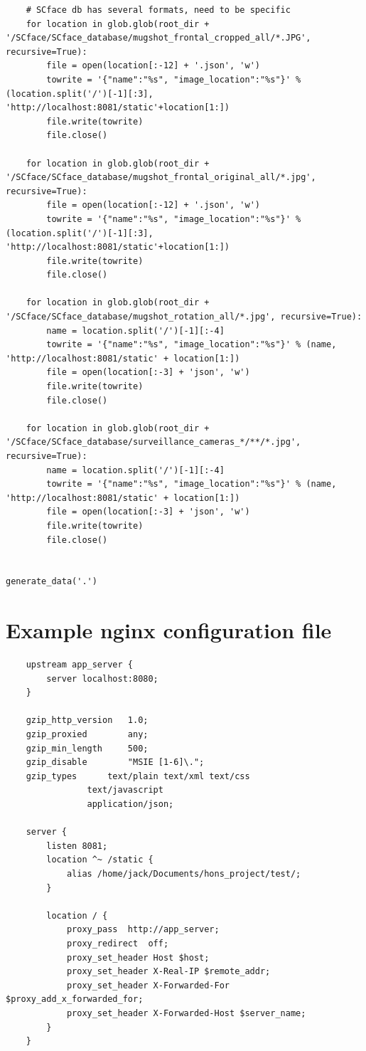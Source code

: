\documentclass[12pt]{article}
\begin{document}
\begin{appendices}
\begin{lstlisting}
    # SCface db has several formats, need to be specific
    for location in glob.glob(root_dir + '/SCface/SCface_database/mugshot_frontal_cropped_all/*.JPG', recursive=True):
        file = open(location[:-12] + '.json', 'w')
        towrite = '{"name":"%s", "image_location":"%s"}' % (location.split('/')[-1][:3], 'http://localhost:8081/static'+location[1:])
        file.write(towrite)
        file.close()

    for location in glob.glob(root_dir + '/SCface/SCface_database/mugshot_frontal_original_all/*.jpg', recursive=True):
        file = open(location[:-12] + '.json', 'w')
        towrite = '{"name":"%s", "image_location":"%s"}' % (location.split('/')[-1][:3], 'http://localhost:8081/static'+location[1:])
        file.write(towrite)
        file.close()

    for location in glob.glob(root_dir + '/SCface/SCface_database/mugshot_rotation_all/*.jpg', recursive=True):
        name = location.split('/')[-1][:-4]
        towrite = '{"name":"%s", "image_location":"%s"}' % (name, 'http://localhost:8081/static' + location[1:])
        file = open(location[:-3] + 'json', 'w')
        file.write(towrite)
        file.close()

    for location in glob.glob(root_dir + '/SCface/SCface_database/surveillance_cameras_*/**/*.jpg', recursive=True):
        name = location.split('/')[-1][:-4]
        towrite = '{"name":"%s", "image_location":"%s"}' % (name, 'http://localhost:8081/static' + location[1:])
        file = open(location[:-3] + 'json', 'w')
        file.write(towrite)
        file.close()


generate_data('.')
\end{lstlisting}


\section{Example nginx configuration file}
\begin{lstlisting}
	upstream app_server {
		server localhost:8080;
	}

	gzip_http_version	1.0;
	gzip_proxied		any;
	gzip_min_length		500;
	gzip_disable		"MSIE [1-6]\.";
	gzip_types		text/plain text/xml text/css
				text/javascript
				application/json;

	server {
		listen 8081;
		location ^~ /static {
			alias /home/jack/Documents/hons_project/test/;
		}

		location / {
			proxy_pass	http://app_server;
			proxy_redirect	off;
			proxy_set_header Host $host;
			proxy_set_header X-Real-IP $remote_addr;
			proxy_set_header X-Forwarded-For $proxy_add_x_forwarded_for;
			proxy_set_header X-Forwarded-Host $server_name;
		}
	}
\end{lstlisting}


\end{appendices}
\end{document}

